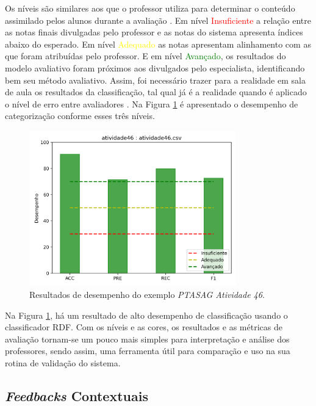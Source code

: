 Os níveis são similares aos que o professor utiliza para determinar o conteúdo assimilado pelos alunos durante a avaliação \cite{nascimento2020}. Em nível \textcolor{red}{Insuficiente} a relação entre as notas finais divulgadas pelo professor e as notas do sistema apresenta índices abaixo do esperado. Em nível \textcolor{yellow}{Adequado} as notas apresentam alinhamento com as que foram atribuídas pelo professor. E em nível \textcolor{green}{Avançado}, os resultados do modelo avaliativo foram próximos aos divulgados pelo especialista, identificando bem seu método avaliativo. Assim, foi necessário trazer para a realidade em sala de aula os resultados da classificação, tal qual já é a realidade quando é aplicado o nível de erro entre avaliadores \cite{almeida-junior2017}. Na Figura \ref{fig-ptasag-performance-46} é apresentado o desempenho de categorização conforme esses três níveis.

\begin{figure}[!t]
 \centering
 \includegraphics[width=0.8\textwidth]{figuras/exemplo/exemplo-ptasag-rdf.png}
 \caption{Resultados de desempenho do exemplo \textit{PTASAG Atividade 46}.}
 \label{fig-ptasag-performance-46}
\end{figure}

Na Figura \ref{fig-ptasag-performance-46}, há um resultado de alto desempenho de classificação usando o classificador RDF. Com os níveis e as cores, os resultados e as métricas de avaliação tornam-se um pouco mais simples para interpretação e análise dos professores, sendo assim, uma ferramenta útil para comparação e uso na sua rotina de validação do sistema.


\subsection{\textit{Feedbacks} Contextuais}
\label{subsec-feedbacks-contextuais}

